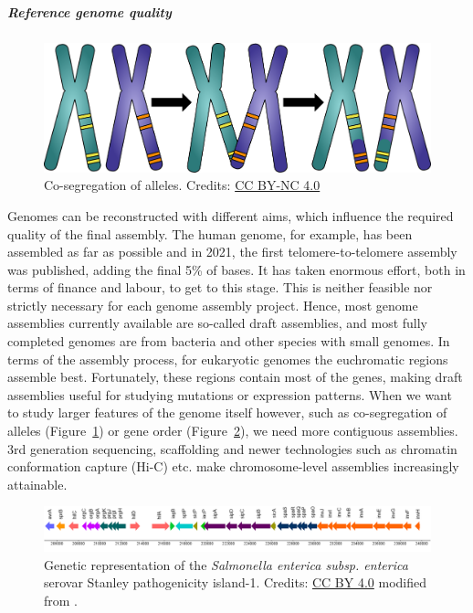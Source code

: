 \subparagraph{Reference genome quality}\label{chapter5_reference_genome_quality}

\begin{figure}[!htbp]
\centering
\includegraphics[width=0.375\linewidth]{files/co-segregation_alt-be606caac3ebd964dddd0b776d6326c8.pdf}
\caption[]{Co-segregation of alleles. \newline
Credits: \href{https://creativecommons.org/licenses/by-nc/4.0/}{CC BY-NC 4.0} \cite{own_5_2024}}
\label{co_segregation_alt}
\end{figure}

Genomes can be reconstructed with different aims, which influence the
required quality of the final assembly. The human genome, for example, has
been assembled as far as possible and in 2021, the first telomere-to-telomere
assembly was published, adding the final 5\% of
bases. It has taken enormous effort, both in terms of finance and labour,
to get to this stage. This is neither feasible nor strictly necessary for
each genome assembly project. Hence, most genome assemblies currently
available are so-called draft assemblies, and most fully completed genomes
are from bacteria and other species with small genomes. In terms of the
assembly process, for eukaryotic genomes the euchromatic regions assemble
best. Fortunately, these regions contain most of the genes, making draft
assemblies useful for studying mutations or expression patterns. When we
want to study larger features of the genome itself however, such as
co-segregation of alleles (Figure~\ref{co_segregation_alt}) or gene order (Figure~\ref{salmonella_alt}),
we need more contiguous assemblies. 3rd generation sequencing, scaffolding
and newer technologies such as chromatin conformation capture (Hi-C) etc.
make chromosome-level assemblies increasingly attainable.

\begin{figure}[!htbp]
\centering
\includegraphics[width=0.7\linewidth]{files/salmonella_alt-bd73277b95307f2b3c81dbcb06f1536e.png}
\caption[]{Genetic representation of the \textit{Salmonella enterica subsp. enterica} serovar Stanley pathogenicity island-1.
Credits: \href{https://creativecommons.org/licenses/by/4.0/}{CC BY 4.0} modified from \cite{salmonella_alt_2019}.}
\label{salmonella_alt}
\end{figure}


